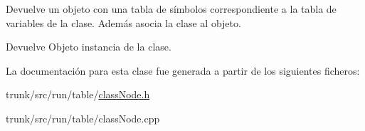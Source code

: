 Devuelve un objeto con una tabla de símbolos correspondiente a la tabla de variables de la clase. Además asocia la clase al objeto. \begin{DoxyReturn}{Devuelve}
Objeto instancia de la clase. 
\end{DoxyReturn}


La documentación para esta clase fue generada a partir de los siguientes ficheros\-:\begin{DoxyCompactItemize}
\item 
trunk/src/run/table/\hyperlink{classNode_8h}{class\-Node.\-h}\item 
trunk/src/run/table/class\-Node.\-cpp\end{DoxyCompactItemize}

